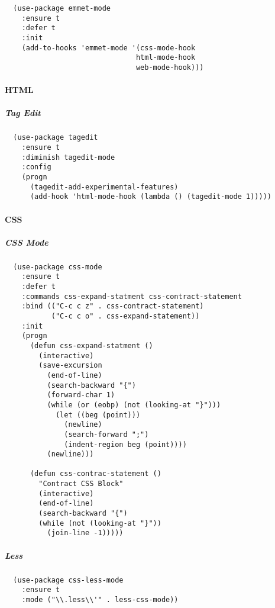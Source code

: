 \documentclass[11pt]{article}
\begin{document}
\begin{verbatim}
  (use-package emmet-mode
    :ensure t
    :defer t
    :init
    (add-to-hooks 'emmet-mode '(css-mode-hook
                               html-mode-hook
                               web-mode-hook)))
\end{verbatim}

\paragraph*{HTML}
\label{sec:orgc0eb211}
\subparagraph*{Tag Edit}
\label{sec:org390cb0e}

\begin{verbatim}
  (use-package tagedit
    :ensure t
    :diminish tagedit-mode
    :config
    (progn
      (tagedit-add-experimental-features)
      (add-hook 'html-mode-hook (lambda () (tagedit-mode 1)))))
\end{verbatim}

\paragraph*{CSS}
\label{sec:org74dbce2}
\subparagraph*{CSS Mode}
\label{sec:orgdbff771}

\begin{verbatim}
  (use-package css-mode
    :ensure t
    :defer t
    :commands css-expand-statment css-contract-statement
    :bind (("C-c c z" . css-contract-statement)
           ("C-c c o" . css-expand-statement))
    :init
    (progn
      (defun css-expand-statment ()
        (interactive)
        (save-excursion
          (end-of-line)
          (search-backward "{")
          (forward-char 1)
          (while (or (eobp) (not (looking-at "}")))
            (let ((beg (point)))
              (newline)
              (search-forward ";")
              (indent-region beg (point))))
          (newline)))

      (defun css-contrac-statement ()
        "Contract CSS Block"
        (interactive)
        (end-of-line)
        (search-backward "{")
        (while (not (looking-at "}"))
          (join-line -1)))))
\end{verbatim}

\subparagraph*{Less}
\label{sec:orge72d2b6}

\begin{verbatim}
  (use-package css-less-mode
    :ensure t
    :mode ("\\.less\\'" . less-css-mode))
\end{verbatim}
\end{document}
